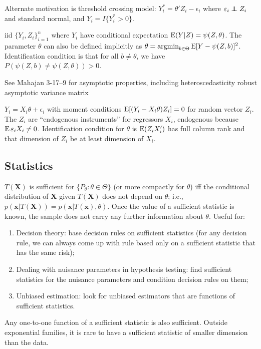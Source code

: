 \documentclass[8pt,letterpaper, landscape]{extarticle} %
\newcommand{\mX}{\ensuremath{\mathbf{X}}}
\newcommand{\mx}{\ensuremath{\mathbf{x}}}
\begin{document}
\begin{multicols}{3}
\begin{description}
Alternate motivation is threshold crossing model: $ Y_i^* = \theta' Z_i - \epsilon_i $ where $ \epsilon_i \independent Z_i $ and standard normal, and $ Y_i = I\{Y_i^* > 0 \} $.

 iid $ \{ Y_i , Z_i \}_{i=1}^{n} $ where $ Y_i $ have conditional expectation $ \operatorname{E} (Y|Z) = \psi (Z, \theta) $. The parameter $ \theta $ can also be defined implicitly as $ \theta = \operatorname*{argmin}_{b \in \Theta} \operatorname{E} [Y - \psi(Z,b)]^2 $. Identification condition is that for all $ b \neq \theta $, we have $ P (\psi(Z, b) \neq \psi(Z, \theta)) > 0 $.

See Mahajan 3-17--9 for asymptotic properties, including heteroscedasticity robust asymptotic  variance matrix

 $ Y_i = X_i \theta + \epsilon_i $ with moment conditions $ \operatorname{E} [(Y_i - X_i \theta) Z_i ] = 0 $ for random vector $ Z_i $. The $ Z_i $ are ``endogenous instruments'' for regressors $ X_i $, endogenous because $ \operatorname{E} \varepsilon_i X_i \neq 0 $. Identification condition for $ \theta $ is $ \operatorname{E} (Z_i X_{i}') $ has full column rank and that dimension of $ Z_i $ be at least dimension of $ X_i $.

\subsection{Statistics}
 $ T(\mX) $ is sufficient for $ \{P_\theta \colon \theta \in \Theta \} $ (or more compactly for $ \theta $) iff the conditional distribution of $ \mX $ given $ T(\mX) $ does not depend on $ \theta $; i.e., $ p(\mx | T(\mX)) = p(\mx | T(\mx), \theta) $. Once the value of a sufficient statistic is known, the sample does not carry any further information about $ \theta $. Useful for:
\begin{enumerate}
\item Decision theory: base decision rules on sufficient statistics (for any decision rule, we can always come up with rule based only on a sufficient statistic that has the same risk);
\item Dealing with nuisance parameters in hypothesis testing: find sufficient statistics for the nuisance parameters and condition decision rules on them;
\item Unbiased estimation: look for unbiased estimators that are functions of sufficient statistics.
\end{enumerate}
Any one-to-one function of a sufficient statistic is also sufficient. Outside exponential families, it is rare to have a sufficient statistic of smaller dimension than the data.


\end{description}
\end{multicols}
\end{document}
